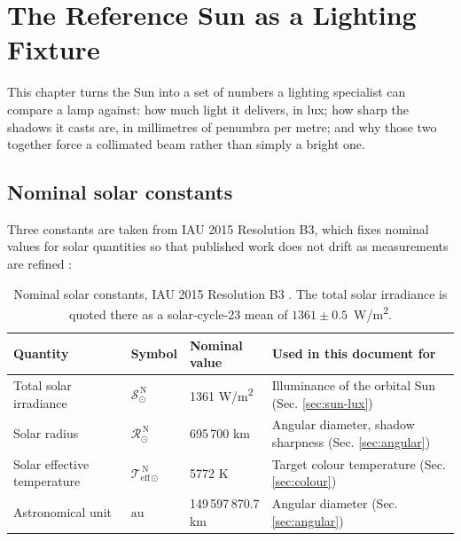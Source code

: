 \chapter{The Reference Sun as a Lighting Fixture}
\label{chap:sun}

This chapter turns the Sun into a set of numbers a lighting specialist can compare a lamp against: how much light it delivers, in lux; how sharp the shadows it casts are, in millimetres of penumbra per metre; and why those two together force a collimated beam rather than simply a bright one.

\section{Nominal solar constants}

Three constants are taken from IAU 2015 Resolution B3, which fixes nominal values for solar quantities so that published work does not drift as measurements are refined \cite{prsa2016iau}:

\begin{table}[!ht]
\centering
\small
\caption[Nominal solar constants used in this document]{Nominal solar constants, IAU 2015 Resolution B3 \cite{prsa2016iau}. The total solar irradiance is quoted there as a solar-cycle-23 mean of $1361 \pm 0.5$~W/m\textsuperscript{2}.}
\label{tab:solar-constants}
\begin{tabularx}{\textwidth}{p{} p{} p{} X}
\toprule
\textbf{Quantity} & \textbf{Symbol} & \textbf{Nominal value} & \textbf{Used in this document for} \\
\midrule
Total solar irradiance   & $\mathcal{S}^{\,\mathrm{N}}_{\odot}$ & 1361 W/m\textsuperscript{2}  & Illuminance of the orbital Sun (Sec. \ref{sec:sun-lux}) \\
Solar radius             & $\mathcal{R}^{\,\mathrm{N}}_{\odot}$ & 695\,700 km                 & Angular diameter, shadow sharpness (Sec. \ref{sec:angular}) \\
Solar effective temperature & $\mathcal{T}^{\,\mathrm{N}}_{\mathrm{eff}\odot}$ & 5772 K       & Target colour temperature (Sec. \ref{sec:colour}) \\
Astronomical unit        & $\mathrm{au}$                        & 149\,597\,870.7 km          & Angular diameter (Sec. \ref{sec:angular}) \\
\bottomrule
\end{tabularx}
\end{table}


